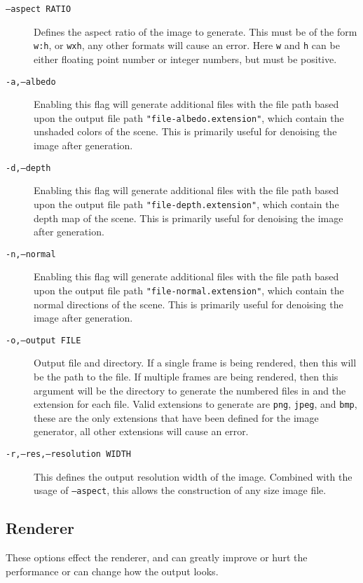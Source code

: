 \documentclass[../pbr.tex]{subfile}
\begin{document}
\begin{description}
    \item[\texttt{--aspect RATIO}] Defines the aspect ratio of the image to
      generate. This must be of the form \texttt{w:h}, or \texttt{wxh}, any
      other formats will cause an error. Here \texttt{w} and \texttt{h} can be
      either floating point number or integer numbers, but must be positive.
    \item[\texttt{-a,--albedo}] Enabling this flag will generate additional
      files with the file path based upon the output file path
      \texttt{"file-albedo.extension"}, which contain the unshaded colors of
      the scene. This is primarily useful for denoising the image after
      generation.
    \item[\texttt{-d,--depth}] Enabling this flag will generate additional
      files with the file path based upon the output file path
      \texttt{"file-depth.extension"}, which contain the depth map of the
      scene. This is primarily useful for denoising the image after generation.
    \item[\texttt{-n,--normal}] Enabling this flag will generate additional
      files with the file path based upon the output file path
      \texttt{"file-normal.extension"}, which contain the normal directions of
      the scene. This is primarily useful for denoising the image after
      generation.
    \item[\texttt{-o,--output FILE}] Output file and directory. If a single
      frame is being rendered, then this will be the path to the file. If
      multiple frames are being rendered, then this argument will be the
      directory to generate the numbered files in and the extension for each
      file. Valid extensions to generate are \texttt{png}, \texttt{jpeg}, and
      \texttt{bmp}, these are the only extensions that have been defined for
      the image generator, all other extensions will cause an error.
    \item[\texttt{-r,--res,--resolution WIDTH}] This defines the output
      resolution width of the image. Combined with the usage of
      \texttt{--aspect}, this allows the construction of any size image file.
\end{description}

\subsection{Renderer}%
\label{sub:renderer}

These options effect the renderer, and can greatly improve or hurt the
performance or can change how the output looks.
\end{document}
